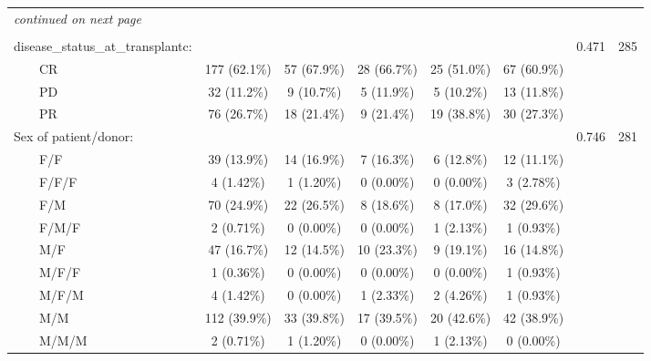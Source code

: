 \documentclass{article}
\begin{document}
\begin{Schunk}
\begin{small}
\begin{longtable}{lccccccc}
    \hline
    \hline  
    \endhead   
    \hline
    \multicolumn{8}{l}{\textit{continued on next page}} \\ 
    \endfoot   
    \multicolumn{8}{l}{}  \\ 
    \endlastfoot 
    disease\_status\_at\_transplantc: &             &            &            &            &            &   0.471   & 285\\ 
$\qquad$CR & 177 (62.1\%) & 57 (67.9\%) & 28 (66.7\%) & 25 (51.0\%) & 67 (60.9\%) &           &    \\ 
$\qquad$PD & 32 (11.2\%)  & 9 (10.7\%)  & 5 (11.9\%)  & 5 (10.2\%)  & 13 (11.8\%) &           &    \\ 
$\qquad$PR & 76 (26.7\%)  & 18 (21.4\%) & 9 (21.4\%)  & 19 (38.8\%) & 30 (27.3\%) &           &    \\ 
Sex of patient/donor: &             &            &            &            &            &   0.746   & 281\\ 
$\qquad$F/F & 39 (13.9\%)  & 14 (16.9\%) & 7 (16.3\%)  & 6 (12.8\%)  & 12 (11.1\%) &           &    \\ 
$\qquad$F/F/F &  4 (1.42\%)  & 1 (1.20\%)  & 0 (0.00\%)  & 0 (0.00\%)  & 3 (2.78\%)  &           &    \\ 
$\qquad$F/M & 70 (24.9\%)  & 22 (26.5\%) & 8 (18.6\%)  & 8 (17.0\%)  & 32 (29.6\%) &           &    \\ 
$\qquad$F/M/F &  2 (0.71\%)  & 0 (0.00\%)  & 0 (0.00\%)  & 1 (2.13\%)  & 1 (0.93\%)  &           &    \\ 
$\qquad$M/F & 47 (16.7\%)  & 12 (14.5\%) & 10 (23.3\%) & 9 (19.1\%)  & 16 (14.8\%) &           &    \\ 
$\qquad$M/F/F &  1 (0.36\%)  & 0 (0.00\%)  & 0 (0.00\%)  & 0 (0.00\%)  & 1 (0.93\%)  &           &    \\ 
$\qquad$M/F/M &  4 (1.42\%)  & 0 (0.00\%)  & 1 (2.33\%)  & 2 (4.26\%)  & 1 (0.93\%)  &           &    \\ 
$\qquad$M/M & 112 (39.9\%) & 33 (39.8\%) & 17 (39.5\%) & 20 (42.6\%) & 42 (38.9\%) &           &    \\ 
$\qquad$M/M/M &  2 (0.71\%)  & 1 (1.20\%)  & 0 (0.00\%)  & 1 (2.13\%)  & 0 (0.00\%)  &           &     \\ 
 

\end{longtable}
\end{small}
\end{Schunk}
\end{document}
